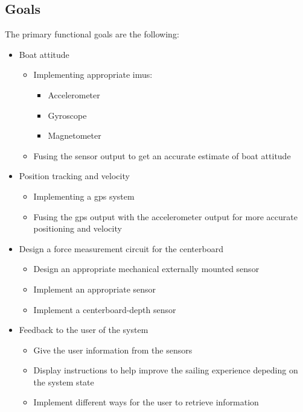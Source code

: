 \subsection{Goals}
The primary functional goals are the following:
\begin{itemize}[noitemsep] %
	\item Boat attitude
	\begin{itemize}[noitemsep]
		\item Implementing appropriate \gls{imu}s:
		\begin{itemize}[noitemsep]
			\item Accelerometer
			\item Gyroscope
			\item Magnetometer
		\end{itemize}
		\item Fusing the sensor output to get an accurate estimate of boat attitude
	\end{itemize}
	\item Position tracking and velocity
	\begin{itemize}[noitemsep]
		\item Implementing a \gls{gps} system
		\item Fusing the \gls{gps} output with the accelerometer output for more accurate positioning and velocity
	\end{itemize}
	\item Design a force measurement circuit for the centerboard
	\begin{itemize}[noitemsep]
		\item Design an appropriate mechanical externally mounted sensor
		\item Implement an appropriate sensor
		\item Implement a centerboard-depth sensor
	\end{itemize}
	\item  Feedback to the user of the system
	\begin{itemize}[noitemsep]
		\item Give the user information from the sensors
		\item Display instructions to help improve the sailing experience depeding on the system state
		\item Implement different ways for the user to retrieve information
	\end{itemize}
\end{itemize}

